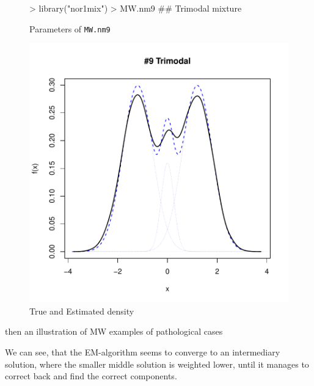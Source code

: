 \begin{figure}[h]
    \centering
    \begin{minipage}{0.45\textwidth}
\begin{Schunk}
\begin{Sinput}
>     library("nor1mix")
>     MW.nm9 ## Trimodal mixture
\end{Sinput}
\end{Schunk}
        \caption{Parameters of {\tt MW.nm9}}
        \label{tab:MW.nm9}
    \end{minipage}
    \begin{minipage}{0.45\textwidth}
\includegraphics{chapter1-figTrimodal}
        \caption{True and Estimated density}
        \label{fig:MW.nm9}
    \end{minipage}
\end{figure}

then an illustration of MW examples of pathological cases

We can see, that the EM-algorithm seems to converge to an intermediary
solution, where the smaller middle solution is weighted lower, until it manages
to correct back and find the correct components.





